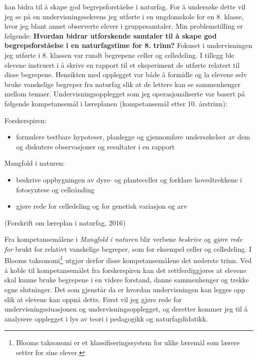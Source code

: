 \documentclass[main.tex]{subfiles}
\begin{document}
kan bidra til å skape god begrepsforståelse i naturfag. For å undersøke dette vil jeg se 
på en undervisningssekvens jeg utførte i en ungdomskole for en 8. klasse, hvor jeg blant
annet observerte elever i gruppesamtaler.
\newline
\newline
Min problemstilling er følgende:
\newline
\newline
\textbf{Hvordan bidrar utforskende samtaler til å skape god begrepsforståelse i en naturfagstime 
for 8. trinn?}
\newline
\newline
Fokuset i undervisningen jeg utførte i 8. klassen var rundt begrepene celler og celledeling. 
I tillegg ble elevene instruert i å skrive en rapport til et eksperiment de utførte relatert 
til disse begrepene. Hensikten med opplegget var både å formidle og la elevene selv bruke 
vanskelige begreper fra naturfag slik at de lettere kan se sammenhenger mellom temaer.
\newline
\newline
Undervisningsopplegget som jeg operasjonaliserte var basert på følgende kompetansemål i 
læreplanen (kompetansemål etter 10. årstrinn):
\newpage
\begin{displayquote}
Forskerspiren:
\begin{itemize}
\vspace{-2mm}
\item formulere testbare hypoteser, planlegge og gjennomføre undersøkelser 
av dem og diskutere observasjoner og resultater i en rapport
\end{itemize}
Mangfold i naturen:
\begin{itemize}
\vspace{-2mm}
\item beskrive oppbygningen av dyre- og planteceller og forklare hovedtrekkene i fotosyntese 
og celleånding
\vspace{-2mm}
\item gjøre rede for celledeling og for genetisk variasjon og arv
\end{itemize}
\begin{flushright}
(Forskrift om læreplan i naturfag, 2016)
\end{flushright}
\end{displayquote} 
Fra kompetansemålene i \emph{Mangfold i naturen} blir verbene \emph{beskrive} og \emph{gjøre rede 
for} brukt for relativt vanskelige begreper, som for eksempel celler og celledeling. I Blooms 
taksonomi\footnote[1]{Blooms taksonomi er et klassifiseringssystem for ulike læremål som lærere 
setter for sine elever.} utgjør derfor disse kompetansemålene det nederste trinn. Ved å koble til 
kompetansemålet fra forskerspiren kan det rettferdiggjøres at elevene skal kunne bruke begrepene 
i en videre forstand, danne sammenhenger og trekke egne slutninger. Det som gjenstår da er hvordan 
undervisningen kan legges opp slik at elevene kan oppnå dette. Først vil jeg gjøre rede for 
undervisningssiuasjonen og undervisningsopplegget, og deretter kommer jeg til å analysere 
opplegget i lys av teori i pedagogikk og naturfagdidatikk.
\end{document}
